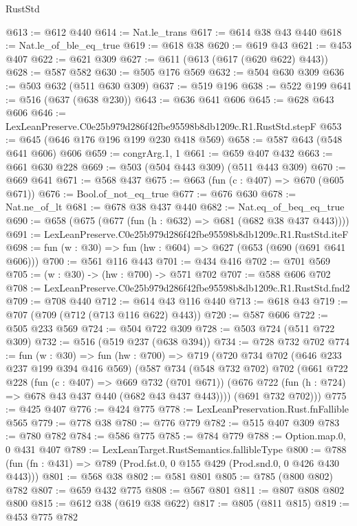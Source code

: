 \begin{lexlean}{RustStd}
\begin{coremodule}
@613 := @612 @440
@614 := Nat.le_trans
@617 := @614 @38 @43 @440
@618 := Nat.le_of_ble_eq_true
@619 := @618 @38
@620 := @619 @43
@621 := @453 @407
@622 := @621 @309
@627 := @611 (@613 (@617 (@620 @622) @443))
@628 := @587 @582
@630 := @505 @176 @569
@632 := @504 @630 @309
@636 := @503 @632 (@511 @630 @309)
@637 := @519 @196
@638 := @522 @199
@641 := @516 (@637 (@638 @230))
@643 := @636 @641 @606
@645 := @628 @643 @606
@646 := LexLeanPreserve.C0e25b979d286f42fbe95598b8db1209c.R1.RustStd.stepF
@653 := @645 (@646 @176 @196 @199 @230 @418 @569)
@658 := @587 @643 (@548 @641 @606) @606
@659 := congrArg.{1, 1}
@661 := @659 @407 @432
@663 := @661 @630 @228
@669 := @503 (@504 @443 @309) (@511 @443 @309)
@670 := @669 @641
@671 := @568 @437
@675 := @663 (fun (c : @407) => @670 (@605 @671))
@676 := Bool.of_not_eq_true
@677 := @676 @630
@678 := Nat.ne_of_lt
@681 := @678 @38 @437 @440
@682 := Nat.eq_of_beq_eq_true
@690 := @658 (@675 (@677 (fun (h : @632) => @681 (@682 @38 @437 @443))))
@691 := LexLeanPreserve.C0e25b979d286f42fbe95598b8db1209c.R1.RustStd.iteF
@698 := fun (w : @30) => fun (hw : @604) => @627 (@653 (@690 (@691 @641 @606)))
@700 := @561 @116 @443
@701 := @434 @416
@702 := @701 @569
@705 := (w : @30) -> (hw : @700) -> @571 @702
@707 := @588 @606 @702
@708 := LexLeanPreserve.C0e25b979d286f42fbe95598b8db1209c.R1.RustStd.fnd2
@709 := @708 @440
@712 := @614 @43 @116 @440
@713 := @618 @43
@719 := @707 (@709 (@712 (@713 @116 @622) @443))
@720 := @587 @606
@722 := @505 @233 @569
@724 := @504 @722 @309
@728 := @503 @724 (@511 @722 @309)
@732 := @516 (@519 @237 (@638 @394))
@734 := @728 @732 @702
@774 := fun (w : @30) =>
  fun (hw : @700) =>
  @719
    (@720
      @734
      @702
      (@646 @233 @237 @199 @394 @416 @569)
      (@587
        @734
        (@548 @732 @702)
        @702
        (@661
          @722
          @228
          (fun (c : @407) => @669 @732 (@701 @671))
          (@676 @722 (fun (h : @724) => @678 @43 @437 @440 (@682 @43 @437 @443))))
        (@691 @732 @702)))
@775 := @425 @407
@776 := @424 @775
@778 := LexLeanPreservation.Rust.fnFallible @565
@779 := @778 @38
@780 := @776 @779
@782 := @515 @407 @309
@783 := @780 @782
@784 := @586 @775
@785 := @784 @779
@788 := Option.map.{0, 0} @431 @407
@789 := LexLeanTarget.RustSemantics.fallibleType
@800 := @788 (fun (fn : @431) => @789 (Prod.fst.{0, 0} @155 @429 (Prod.snd.{0, 0} @426 @430 @443)))
@801 := @568 @38
@802 := @581 @801
@805 := @785 (@800 @802) @782
@807 := @659 @432 @775
@808 := @567 @801
@811 := @807 @808 @802 @800
@815 := @612 @38 (@619 @38 @622)
@817 := @805 (@811 @815)
@819 := @453 @775 @782

\end{coremodule}
\end{lexlean}
